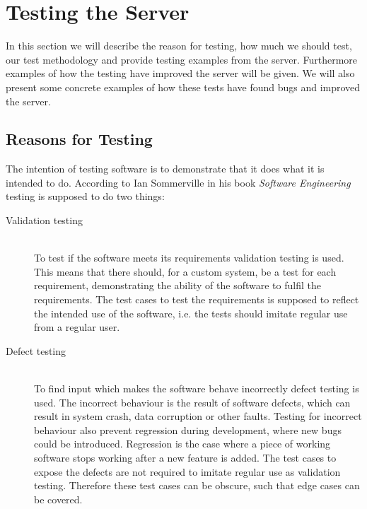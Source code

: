 \section{Testing the Server}\label{sec:testing}
In this section we will describe the reason for testing, how much we should test,
our test methodology and provide testing examples from the server.
Furthermore examples of how the testing have improved the server will be given.
We will also present some concrete examples of how these tests have found bugs and improved the server.

\subsection{Reasons for Testing}
The intention of testing software is to demonstrate that it does what it is intended to do.
According to Ian Sommerville in his book \textit{Software Engineering}\cite[p.~227]{software_engineering} testing is supposed to do two things:

\begin{description}
    \item[Validation testing]\cite[p.~227]{software_engineering} \hfill\\
    To test if the software meets its requirements validation testing is used.
    This means that there should, for a custom system, be a test for each requirement, 
    demonstrating the ability of the software to fulfil the requirements.
    The test cases to test the requirements is supposed to reflect the intended use of the software,
    i.e. the tests should imitate regular use from a regular user.

    \item[Defect testing]\cite[p.~227]{software_engineering} \hfill\\
    To find input which makes the software behave incorrectly defect testing is used.
    The incorrect behaviour is the result of software defects, 
    which can result in system crash, data corruption or other faults.
    Testing for incorrect behaviour also prevent regression during development,
    where new bugs could be introduced.
    Regression is the case where a piece of working software stops working after a new feature is added\cite{regression}.
    The test cases to expose the defects are not required to imitate regular use as validation testing.
    Therefore these test cases can be obscure, such that edge cases can be covered.
\end{description}

